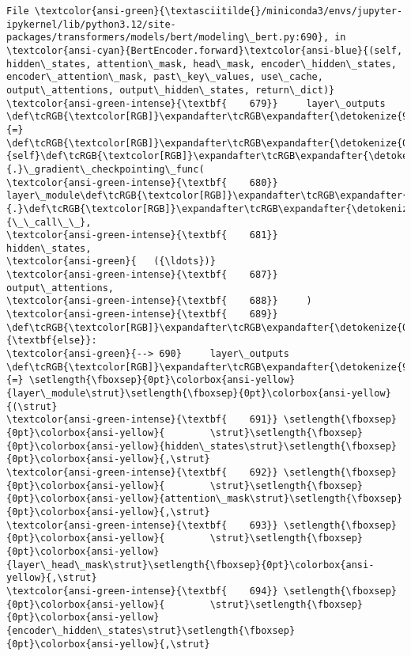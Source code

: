 \documentclass[11pt]{article}
\begin{document}
\begin{Verbatim}[commandchars=\\\{\}, frame=single, framerule=2mm, rulecolor=\color{outerrorbackground}]
File \textcolor{ansi-green}{\textasciitilde{}/miniconda3/envs/jupyter-ipykernel/lib/python3.12/site-packages/transformers/models/bert/modeling\_bert.py:690}, in \textcolor{ansi-cyan}{BertEncoder.forward}\textcolor{ansi-blue}{(self, hidden\_states, attention\_mask, head\_mask, encoder\_hidden\_states, encoder\_attention\_mask, past\_key\_values, use\_cache, output\_attentions, output\_hidden\_states, return\_dict)}
\textcolor{ansi-green-intense}{\textbf{    679}}     layer\_outputs \def\tcRGB{\textcolor[RGB]}\expandafter\tcRGB\expandafter{\detokenize{98,98,98}}{=} \def\tcRGB{\textcolor[RGB]}\expandafter\tcRGB\expandafter{\detokenize{0,135,0}}{self}\def\tcRGB{\textcolor[RGB]}\expandafter\tcRGB\expandafter{\detokenize{98,98,98}}{.}\_gradient\_checkpointing\_func(
\textcolor{ansi-green-intense}{\textbf{    680}}         layer\_module\def\tcRGB{\textcolor[RGB]}\expandafter\tcRGB\expandafter{\detokenize{98,98,98}}{.}\def\tcRGB{\textcolor[RGB]}\expandafter\tcRGB\expandafter{\detokenize{0,0,255}}{\_\_call\_\_},
\textcolor{ansi-green-intense}{\textbf{    681}}         hidden\_states,
\textcolor{ansi-green}{   ({\ldots})}
\textcolor{ansi-green-intense}{\textbf{    687}}         output\_attentions,
\textcolor{ansi-green-intense}{\textbf{    688}}     )
\textcolor{ansi-green-intense}{\textbf{    689}} \def\tcRGB{\textcolor[RGB]}\expandafter\tcRGB\expandafter{\detokenize{0,135,0}}{\textbf{else}}:
\textcolor{ansi-green}{--> 690}     layer\_outputs \def\tcRGB{\textcolor[RGB]}\expandafter\tcRGB\expandafter{\detokenize{98,98,98}}{=} \setlength{\fboxsep}{0pt}\colorbox{ansi-yellow}{layer\_module\strut}\setlength{\fboxsep}{0pt}\colorbox{ansi-yellow}{(\strut}
\textcolor{ansi-green-intense}{\textbf{    691}} \setlength{\fboxsep}{0pt}\colorbox{ansi-yellow}{        \strut}\setlength{\fboxsep}{0pt}\colorbox{ansi-yellow}{hidden\_states\strut}\setlength{\fboxsep}{0pt}\colorbox{ansi-yellow}{,\strut}
\textcolor{ansi-green-intense}{\textbf{    692}} \setlength{\fboxsep}{0pt}\colorbox{ansi-yellow}{        \strut}\setlength{\fboxsep}{0pt}\colorbox{ansi-yellow}{attention\_mask\strut}\setlength{\fboxsep}{0pt}\colorbox{ansi-yellow}{,\strut}
\textcolor{ansi-green-intense}{\textbf{    693}} \setlength{\fboxsep}{0pt}\colorbox{ansi-yellow}{        \strut}\setlength{\fboxsep}{0pt}\colorbox{ansi-yellow}{layer\_head\_mask\strut}\setlength{\fboxsep}{0pt}\colorbox{ansi-yellow}{,\strut}
\textcolor{ansi-green-intense}{\textbf{    694}} \setlength{\fboxsep}{0pt}\colorbox{ansi-yellow}{        \strut}\setlength{\fboxsep}{0pt}\colorbox{ansi-yellow}{encoder\_hidden\_states\strut}\setlength{\fboxsep}{0pt}\colorbox{ansi-yellow}{,\strut}

\end{Verbatim}
\end{document}
